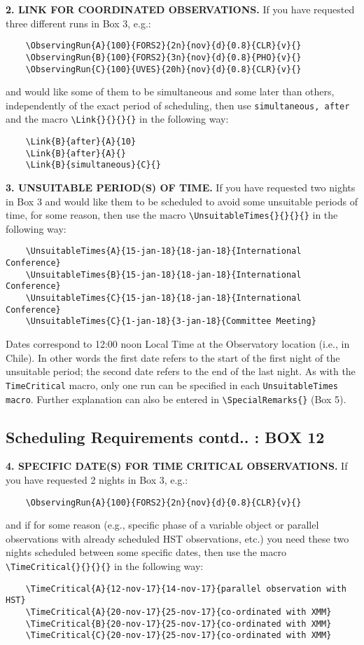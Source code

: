 \documentclass{article}
\begin{document}
\medskip

{\bf 2.  LINK FOR COORDINATED OBSERVATIONS.} If you have requested
three different runs in Box 3, e.g.:
\begin{verbatim}
    \ObservingRun{A}{100}{FORS2}{2n}{nov}{d}{0.8}{CLR}{v}{}
    \ObservingRun{B}{100}{FORS2}{3n}{nov}{d}{0.8}{PHO}{v}{}
    \ObservingRun{C}{100}{UVES}{20h}{nov}{d}{0.8}{CLR}{v}{}
\end{verbatim}
and would like some of them to be simultaneous and some later than
others, independently of the exact period of scheduling, then use
\verb|simultaneous, after| and the macro \verb|\Link{}{}{}{}| in the
following way:
\begin{verbatim}
    \Link{B}{after}{A}{10}
    \Link{B}{after}{A}{}
    \Link{B}{simultaneous}{C}{}
\end{verbatim}

\medskip

{\bf 3. UNSUITABLE PERIOD(S) OF TIME.}  If you have requested two
nights in Box 3 and would like them to be scheduled to avoid some
unsuitable periods of time, for some reason, then use the macro
\verb|\UnsuitableTimes{}{}{}{}| in the following way:
\begin{verbatim}
    \UnsuitableTimes{A}{15-jan-18}{18-jan-18}{International Conference}
    \UnsuitableTimes{B}{15-jan-18}{18-jan-18}{International Conference}
    \UnsuitableTimes{C}{15-jan-18}{18-jan-18}{International Conference}
    \UnsuitableTimes{C}{1-jan-18}{3-jan-18}{Committee Meeting}
\end{verbatim}

Dates correspond to 12:00 noon Local Time at
the Observatory location (i.e., in Chile).
In other words the first date refers to the start of the first night
of the unsuitable period; the second date refers to the end of the last night.
As with the \verb|TimeCritical| macro, only one run can be specified in each
\verb|UnsuitableTimes macro|. 
Further explanation can also be entered in  \verb|\SpecialRemarks{}| (Box 5).

\subsection{Scheduling Requirements contd.. : {\bf BOX 12}}
\label{sec:timecrit}

{\bf 4. SPECIFIC DATE(S) FOR TIME CRITICAL  OBSERVATIONS.} If you have
requested 2 nights in Box 3, e.g.:
\begin{verbatim}
    \ObservingRun{A}{100}{FORS2}{2n}{nov}{d}{0.8}{CLR}{v}{} 
\end{verbatim}
and if for some reason (e.g., specific phase of a variable object
or parallel observations with already scheduled HST observations,
etc.)  you need these two nights scheduled between some specific
dates, then use the macro \verb|\TimeCritical{}{}{}{}| in the
following way:
\begin{verbatim}
    \TimeCritical{A}{12-nov-17}{14-nov-17}{parallel observation with HST}
    \TimeCritical{A}{20-nov-17}{25-nov-17}{co-ordinated with XMM}     
    \TimeCritical{B}{20-nov-17}{25-nov-17}{co-ordinated with XMM}
    \TimeCritical{C}{20-nov-17}{25-nov-17}{co-ordinated with XMM}
\end{verbatim}
\end{document}
